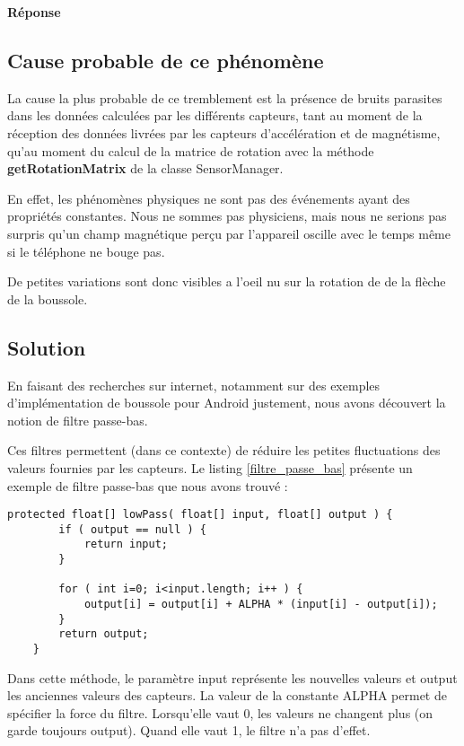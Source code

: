 \documentclass[francais,12pt]{article}
\begin{document}
	{\color[rgb]{0,0.5,0.23}\textbf{Réponse}}
	
	\subsection*{Cause probable de ce phénomène}
	La cause la plus probable de ce tremblement est la présence de bruits parasites dans les données calculées par les différents capteurs, tant au moment de la réception des données livrées par les capteurs d'accélération et de magnétisme, qu'au moment du calcul de la matrice de rotation avec la méthode \textbf{getRotationMatrix} de la classe SensorManager. 
	
	En effet, les phénomènes physiques ne sont pas des événements ayant des propriétés constantes. Nous ne sommes pas physiciens, mais nous ne serions pas surpris qu'un champ magnétique perçu par l'appareil oscille avec le temps même si le téléphone ne bouge pas. 
	
	De petites variations sont donc visibles a l'oeil nu sur la rotation de de la flèche de la boussole.
	
	\subsection*{Solution}
	En faisant des recherches sur internet, notamment sur des exemples d'implémentation de boussole pour Android justement, nous avons découvert la notion de filtre passe-bas. 
	
	Ces filtres permettent (dans ce contexte) de réduire les petites fluctuations des valeurs fournies par les capteurs. Le listing \ref{filtre_passe_bas} présente un exemple de filtre passe-bas que nous avons trouvé : 
	
	\lstset{escapechar=@,style=JavaCode}
	\begin{lstlisting}[caption={Exemple de filtre passe-bas},label={filtre_passe_bas}]
	protected float[] lowPass( float[] input, float[] output ) {
		if ( output == null ) {
			return input;  
		}
		   
		for ( int i=0; i<input.length; i++ ) {
			output[i] = output[i] + ALPHA * (input[i] - output[i]);
		}
		return output;
	}
	\end{lstlisting}
	
	Dans cette méthode, le paramètre input représente les nouvelles valeurs et output les anciennes valeurs des capteurs. La valeur de la constante ALPHA permet de spécifier la force du filtre. Lorsqu'elle vaut 0, les valeurs ne changent plus (on garde toujours output). Quand elle vaut 1, le filtre n'a pas d'effet.
	
\end{document}
